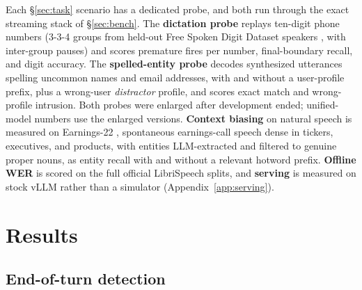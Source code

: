 \documentclass[11pt]{article}
\begin{document}
Each \S\ref{sec:task} scenario has a dedicated probe, and both run through the exact streaming stack of \S\ref{sec:bench}. The \textbf{dictation probe} replays ten-digit phone numbers (3-3-4 groups from held-out Free Spoken Digit Dataset speakers \citep{jackson2018fsdd}, with inter-group pauses) and scores premature fires per number, final-boundary recall, and digit accuracy. The \textbf{spelled-entity probe} decodes synthesized utterances spelling uncommon names and email addresses, with and without a user-profile prefix, plus a wrong-user \emph{distractor} profile, and scores exact match and wrong-profile intrusion. Both probes were enlarged after development ended; unified-model numbers use the enlarged versions. \textbf{Context biasing} on natural speech is measured on Earnings-22 \citep{delrio2022earnings22}, spontaneous earnings-call speech dense in tickers, executives, and products, with entities LLM-extracted and filtered to genuine proper nouns, as entity recall with and without a relevant hotword prefix. \textbf{Offline WER} is scored on the full official LibriSpeech splits, and \textbf{serving} is measured on stock vLLM rather than a simulator (Appendix~\ref{app:serving}).

\section{Results}
\label{sec:results}

\subsection{End-of-turn detection}
\label{sec:endpointresults}
\end{document}
